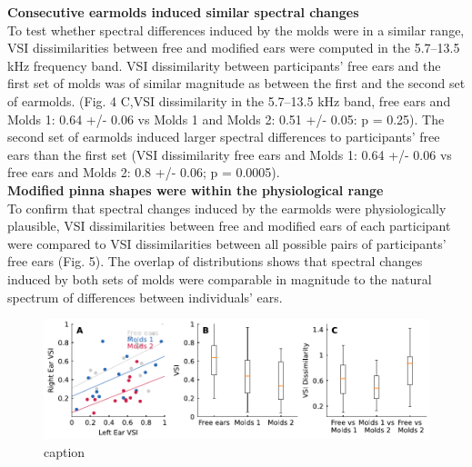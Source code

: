 \newpage

\noindent\textbf{Consecutive earmolds induced similar spectral changes}\\

To test whether spectral differences induced by the molds were in a similar range, VSI dissimilarities between free and modified ears were computed in the 5.7–13.5 kHz frequency band. VSI dissimilarity between participants' free ears and the first set of molds was of similar magnitude as between the first and the second set of earmolds. (Fig. 4 C,VSI dissimilarity in the 5.7–13.5 kHz band, free ears and Molds 1:  0.64 +/- 0.06 vs Molds 1 and Molds 2:  0.51 +/- 0.05: p = 0.25). The second set of earmolds induced larger spectral differences to participants' free ears than the first set (VSI dissimilarity free ears and Molds 1:  0.64 +/- 0.06 vs free ears and Molds 2: 0.8 +/- 0.06; p = 0.0005). 
\\

\noindent\textbf{Modified pinna shapes were within the physiological range}\\

To confirm that spectral changes induced by the earmolds were physiologically plausible, VSI dissimilarities between free and modified ears of each participant were compared to VSI dissimilarities between all possible pairs of participants’ free ears (Fig. 5). The overlap of distributions shows that spectral changes induced by both sets of molds were comparable in magnitude to the natural spectrum of differences between individuals’ ears.\\

\begin{figure}[ht]
 	\includegraphics[width=12.8cm, left]{../Results/figures/fig4/fig4}
	\caption{caption}
        \label{fig:first}
\end{figure}

